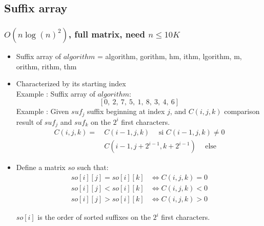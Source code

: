 \subsection{Suffix array}
\subsubsection{$O(n\log(n)^2)$, full matrix, need $n \leq 10K$}
\begin{itemize}
\item Suffix array of $algorithm$ = algorithm, gorithm, hm, ithm, lgorithm, m, orithm, rithm, thm

\item Characterized by its starting index\\
Example : Suffix array of $algorithm$: $$[0, \ 2, \ 7, \ 5, \ 1, \ 8, \ 3, \ 4, \ 6]$$
Example : Given $suf_j$ suffix beginning at index $j$, and $C(i, j, k)$ comparison result of $suf_j$ and $suf_k$ on the $2^i$ first characters.
\begin{align*}
C(i, j, k) = & \ C(i - 1, j, k) \hspace{15pt} \text{si $C(i - 1, j, k) \neq 0$} \\
             & \ C(i - 1, j + 2^{i - 1}, k + 2^{i - 1}) \hspace{15pt} \text{else}
\end{align*}

\end{itemize}
\begin{itemize}

\item Define a matrix $so$ such that:
\begin{align*}
so[i][j] = so[i][k] & \Leftrightarrow C(i, j, k) = 0 \\
so[i][j] < so[i][k] & \Leftrightarrow C(i, j, k) < 0 \\
so[i][j] > so[i][k] & \Leftrightarrow C(i, j, k) > 0 
\end{align*}

$so[i]$ is the order of sorted suffixes on the $2^i$ first characters.

\end{itemize}

